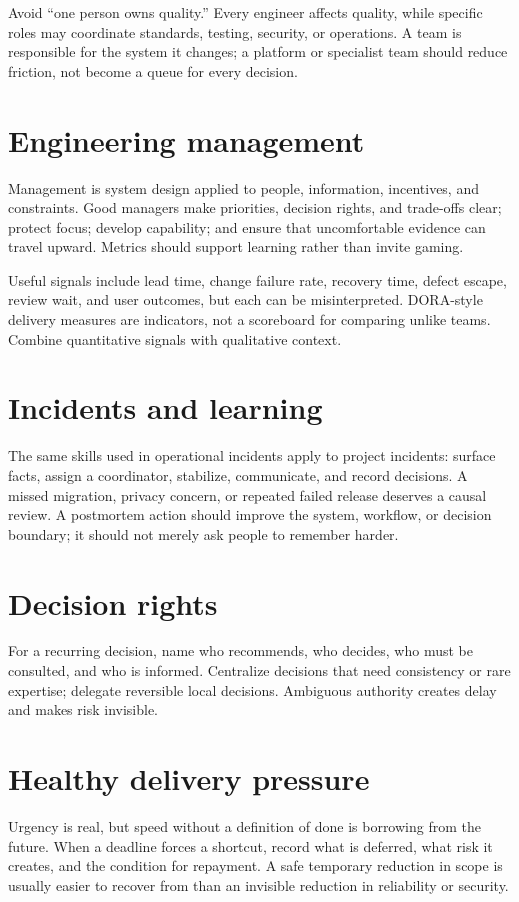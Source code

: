 Avoid “one person owns quality.” Every engineer affects quality, while specific
roles may coordinate standards, testing, security, or operations. A team is
responsible for the system it changes; a platform or specialist team should
reduce friction, not become a queue for every decision.

\section{Engineering management}
Management is system design applied to people, information, incentives, and
constraints. Good managers make priorities, decision rights, and trade-offs
clear; protect focus; develop capability; and ensure that uncomfortable evidence
can travel upward. Metrics should support learning rather than invite gaming.

Useful signals include lead time, change failure rate, recovery time, defect
escape, review wait, and user outcomes, but each can be misinterpreted. DORA-style
delivery measures are indicators, not a scoreboard for comparing unlike teams.
Combine quantitative signals with qualitative context.

\section{Incidents and learning}
The same skills used in operational incidents apply to project incidents:
surface facts, assign a coordinator, stabilize, communicate, and record decisions.
A missed migration, privacy concern, or repeated failed release deserves a causal
review. A postmortem action should improve the system, workflow, or decision
boundary; it should not merely ask people to remember harder.

\section{Decision rights}
For a recurring decision, name who recommends, who decides, who must be
consulted, and who is informed. Centralize decisions that need consistency or
rare expertise; delegate reversible local decisions. Ambiguous authority creates
delay and makes risk invisible.

\section{Healthy delivery pressure}
Urgency is real, but speed without a definition of done is borrowing from the
future. When a deadline forces a shortcut, record what is deferred, what risk it
creates, and the condition for repayment. A safe temporary reduction in scope is
usually easier to recover from than an invisible reduction in reliability or
security.

